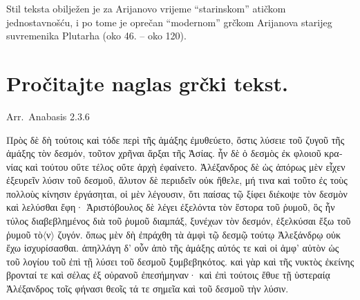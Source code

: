 Stil teksta obilježen je za Arijanovo vrijeme ``starinskom'' atičkom jednostavnošću, i po tome je oprečan ``modernom'' grčkom Arijanova starijeg suvremenika Plutarha (oko 46. – oko 120).


\section*{Pročitajte naglas grčki tekst.}


Arr.\ Anabasis 2.3.6

\medskip

{\large
\begin{greek}
\noindent Πρὸς δὲ δὴ τούτοις καὶ τόδε περὶ τῆς ἁμάξης ἐμυθεύετο, ὅστις λύσειε τοῦ ζυγοῦ τῆς ἁμάξης τὸν δεσμόν, τοῦτον χρῆναι ἄρξαι τῆς Ἀσίας. ἦν δὲ ὁ δεσμὸς ἐκ φλοιοῦ κρανίας καὶ τούτου οὔτε τέλος οὔτε ἀρχὴ ἐφαίνετο. Ἀλέξανδρος δὲ ὡς ἀπόρως μὲν εἶχεν ἐξευρεῖν λύσιν τοῦ δεσμοῦ, ἄλυτον δὲ περιιδεῖν οὐκ ἤθελε, μή τινα καὶ τοῦτο ἐς τοὺς πολλοὺς κίνησιν ἐργάσηται, οἱ μὲν λέγουσιν, ὅτι παίσας τῷ ξίφει διέκοψε τὸν δεσμὸν καὶ λελύσθαι ἔφη· Ἀριστόβουλος δὲ λέγει ἐξελόντα τὸν ἕστορα τοῦ ῥυμοῦ, ὃς ἦν τύλος διαβεβλημένος διὰ τοῦ ῥυμοῦ διαμπάξ, ξυνέχων τὸν δεσμόν, ἐξελκύσαι ἔξω τοῦ ῥυμοῦ τὸ$\langle$ν$\rangle$ ζυγόν. ὅπως μὲν δὴ ἐπράχθη τὰ ἀμφὶ τῷ δεσμῷ τούτῳ Ἀλεξάνδρῳ οὐκ ἔχω ἰσχυρίσασθαι. ἀπηλλάγη  δ' οὖν ἀπὸ τῆς ἁμάξης αὐτός τε καὶ οἱ ἀμφ' αὐτὸν ὡς τοῦ λογίου τοῦ ἐπὶ τῇ λύσει τοῦ δεσμοῦ ξυμβεβηκότος. καὶ γὰρ καὶ τῆς νυκτὸς ἐκείνης βρονταί τε καὶ σέλας ἐξ οὐρανοῦ ἐπεσήμηναν· καὶ ἐπὶ τούτοις ἔθυε τῇ ὑστεραίᾳ Ἀλέξανδρος τοῖς φήνασι θεοῖς τά τε σημεῖα καὶ τοῦ δεσμοῦ τὴν λύσιν.
\end{greek}

}


